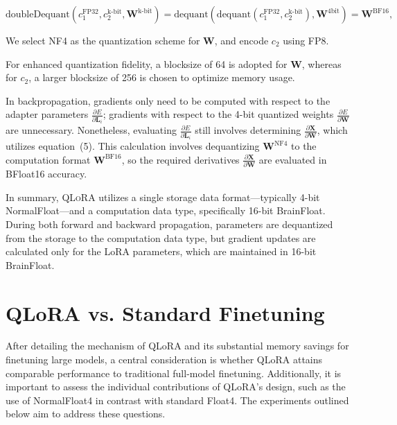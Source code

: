 \begin{equation}
    \text{doubleDequant}(c_1^{\text{FP32}}, c_2^{\text{k-bit}}, \mathbf{W}^{\text{k-bit}}) = \text{dequant}(\text{dequant}(c_1^{\text{FP32}}, c_2^{\text{k-bit}}), \mathbf{W}^{\text{4bit}}) = \mathbf{W}^{\text{BF16}},
\end{equation}

We select NF4 as the quantization scheme for $\mathbf{W}$, and encode $c_2$ using FP8.

For enhanced quantization fidelity, a blocksize of 64 is adopted for $\mathbf{W}$, whereas for $c_2$, a larger blocksize of 256 is chosen to optimize memory usage.

In backpropagation, gradients only need to be computed with respect to the adapter parameters $\frac{\partial E}{\partial \mathbf{L}_i}$; gradients with respect to the 4-bit quantized weights $\frac{\partial E}{\partial \mathbf{W}}$ are unnecessary. Nonetheless, evaluating $\frac{\partial E}{\partial \mathbf{L}_i}$ still involves determining $\frac{\partial \mathbf{X}}{\partial \mathbf{W}}$, which utilizes equation~(5). This calculation involves dequantizing $\mathbf{W}^{\text{NF4}}$ to the computation format $\mathbf{W}^{\text{BF16}}$, so the required derivatives $\frac{\partial \mathbf{X}}{\partial \mathbf{W}}$ are evaluated in BFloat16 accuracy.

In summary, \textsc{QLoRA} utilizes a single storage data format—typically 4-bit NormalFloat—and a computation data type, specifically 16-bit BrainFloat. During both forward and backward propagation, parameters are dequantized from the storage to the computation data type, but gradient updates are calculated only for the LoRA parameters, which are maintained in 16-bit BrainFloat.

\section{QLoRA vs. Standard Finetuning}
\label{sec:comp_to_std}

After detailing the mechanism of QLoRA and its substantial memory savings for finetuning large models, a central consideration is whether QLoRA attains comparable performance to traditional full-model finetuning. Additionally, it is important to assess the individual contributions of QLoRA’s design, such as the use of NormalFloat4 in contrast with standard Float4. The experiments outlined below aim to address these questions.

